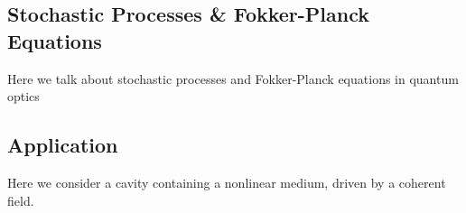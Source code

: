 \subsection{Stochastic Processes \& Fokker-Planck Equations}
Here we talk about stochastic processes and Fokker-Planck equations in quantum optics 
 \cite{Carmichael1992} 
 \cite{Carmichael2008} 
 \cite{Breuer2002} 
\subsection{Application}
Here we consider a cavity containing a nonlinear medium, driven by a coherent field. \cite{Drummond1979}
